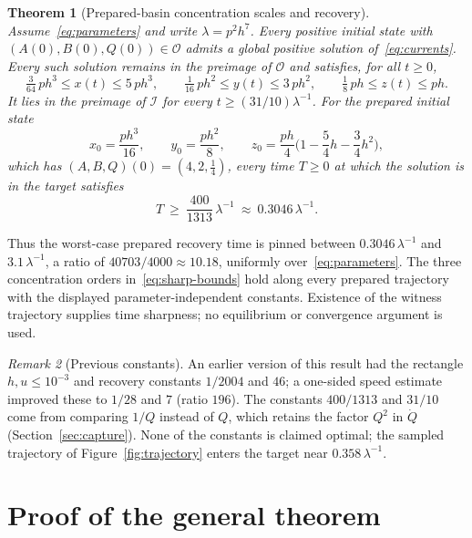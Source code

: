 \documentclass[11pt,a4paper]{article}
\theoremstyle{plain}
\newtheorem{theorem}{Theorem}[section]
\theoremstyle{definition}
\theoremstyle{remark}
\newtheorem{remark}[theorem]{Remark}
\newcommand{\calO}{\mathcal O}
\newcommand{\calI}{\mathcal I}
\begin{document}
\begin{theorem}[Prepared-basin concentration scales and recovery]\label{thm:coupled}
Assume~\eqref{eq:parameters} and write $\lambda=p^2h^7$. Every positive initial state with $(A(0),B(0),Q(0))\in\calO$ admits a global positive solution of~\eqref{eq:currents}. Every such solution remains in the preimage of $\calO$ and satisfies, for all $t\ge0$,
\begin{equation}\label{eq:sharp-bounds}
 \tfrac3{64}\,ph^3\le x(t)\le5\,ph^3,\qquad \tfrac1{16}\,ph^2\le y(t)\le3\,ph^2,\qquad \tfrac18\,ph\le z(t)\le ph.
\end{equation}
It lies in the preimage of $\calI$ for every $t\ge(31/10)\lambda^{-1}$. For the prepared initial state
\begin{equation}\label{eq:witness}
 x_0=\frac{ph^3}{16},\qquad y_0=\frac{ph^2}{8},\qquad z_0=\frac{ph}{4}\Big(1-\frac54h-\frac34h^2\Big),
\end{equation}
which has $(A,B,Q)(0)=(4,2,\tfrac14)$, every time $T\ge0$ at which the solution is in the target satisfies
\begin{equation}\label{eq:time-bounds}
 T\ \ge\ \frac{400}{1313}\,\lambda^{-1}\ \approx\ 0.3046\,\lambda^{-1}.
\end{equation}
\end{theorem}

Thus the worst-case prepared recovery time is pinned between $0.3046\,\lambda^{-1}$ and $3.1\,\lambda^{-1}$, a ratio of $40703/4000\approx10.18$, uniformly over~\eqref{eq:parameters}. The three concentration orders in~\eqref{eq:sharp-bounds} hold along every prepared trajectory with the displayed parameter-independent constants. Existence of the witness trajectory supplies time sharpness; no equilibrium or convergence argument is used.

\begin{remark}[Previous constants]
An earlier version of this result had the rectangle $h,u\le10^{-3}$ and recovery constants $1/2004$ and $46$; a one-sided speed estimate improved these to $1/28$ and $7$ (ratio $196$). The constants $400/1313$ and $31/10$ come from comparing $1/Q$ instead of $Q$, which retains the factor $Q^2$ in $\dot Q$ (Section~\ref{sec:capture}). None of the constants is claimed optimal; the sampled trajectory of Figure~\ref{fig:trajectory} enters the target near $0.358\,\lambda^{-1}$.
\end{remark}

\section{Proof of the general theorem}
\label{sec:general-proof}
\end{document}

